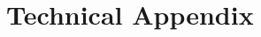 \documentclass{mimosis}
\begin{document}





\cleardoublepage


\part{Technical Appendix}
\appendix





\end{document}
